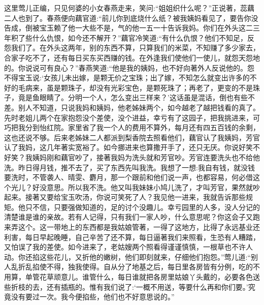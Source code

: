 \begin{parag}
    这里莺儿正编，只见何婆的小女春燕走来，笑问:“姐姐织什么呢？”正说著，蕊藕二人也到了。春燕便向藕官道:“前儿你到底烧什么纸？被我姨妈看见了，要告你没告成，倒被宝玉赖了他一大些不是，气的他一五一十告诉我妈。你们在外头这二三年积了些什么仇恨，如今还不解开？”藕官冷笑道:“有什么仇恨？他们不知足，反怨我们了。在外头这两年，别的东西不算，只算我们的米菜，不知赚了多少家去，合家子吃不了，还有每日买东买西赚的钱。在外逢我们使他们一使儿，就怨天怨地的。你说说可有良心？”春燕笑道:“他是我的姨妈，也不好向著外人反说他的。怨不得宝玉说:‘女孩儿未出嫁，是颗无价之宝珠；出了嫁，不知怎么就变出许多的不好的毛病来，虽是颗珠子，却没有光彩宝色，是颗死珠了；再老了，更变的不是珠子，竟是鱼眼睛了。分明一个人，怎么变出三样来？’这话虽是混话，倒也有些不差。别人不知道，只说我妈和姨妈，他老姊妹两个，如今越老了越把钱看的真了。先时老姐儿两个在家抱怨没个差使，没个进益，幸亏有了这园子，把我挑进来，可巧把我分到怡红院。家里省了我一个人的费用不算外，每月还有四五百钱的余剩，这也还说不够。后来老姊妹二人都派到梨香院去照看他们，藕官认了我姨妈，芳官认了我妈，这几年著实宽裕了。如今挪进来也算撒开手了，还只无厌。你说好笑不好笑？我姨妈刚和藕官吵了，接著我妈为洗头就和芳官吵。芳官连要洗头也不给他洗。昨日得月钱，推不去了，买了东西先叫我洗。我想了一想:我自有钱，就没钱要洗时，不管袭人、晴雯、麝月，那一个跟前和他们说一声，也都容易，何必借这个光儿？好没意思。所以我不洗。他又叫我妹妹小鸠儿洗了，才叫芳官，果然就吵起来。接著又要给宝玉吹汤，你说可笑死了人？我见他一进来，我就告诉那些规矩。他只不信，只要强做知道的，足的讨个没趣儿。幸亏园里的人多，没人分记的清楚谁是谁的亲故。若有人记得，只有我们一家人吵，什么意思呢？你这会子又跑来弄这个。这一带地上的东西都是我姑娘管著，一得了这地方，比得了永远基业还利害，每日早起晚睡，自己辛苦了还不算，每日逼著我们来照看，生恐有人糟踏，又怕误了我的差使。如今进来了，老姑嫂两个照看得谨谨慎慎，一根草也不许人动。你还掐这些花儿，又折他的嫩树，他们即刻就来，仔细他们抱怨。”莺儿道:“别人乱折乱掐使不得，独我使得。自从分了地基之后，每日里各房皆有分例，吃的不用算，单管花草顽意儿。谁管什么，每日谁就把各房里姑娘丫头戴的，必要各色送些折枝的去，还有插瓶的。惟有我们说了:‘一概不用送，等要什么再和你们要。’究竟没有要过一次。我今便掐些，他们也不好意思说的。”
\end{parag}


